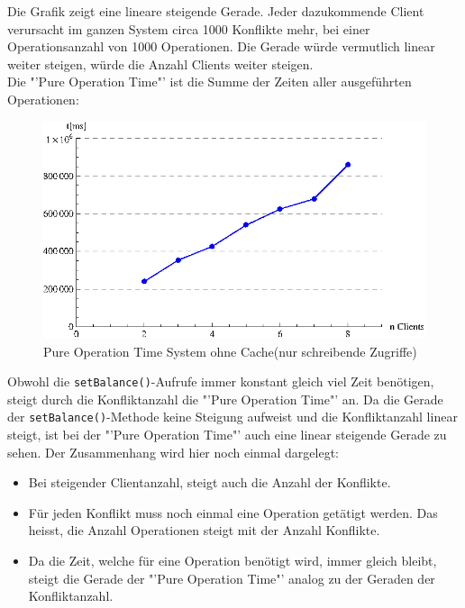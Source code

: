 Die Grafik zeigt eine lineare steigende Gerade. Jeder dazukommende Client verursacht im ganzen System circa 1000 Konflikte mehr, bei einer Operationsanzahl von 1000 Operationen. Die Gerade würde vermutlich linear weiter steigen, würde die Anzahl Clients weiter steigen.\\

Die "'Pure Operation Time"' ist die Summe der Zeiten aller ausgeführten Operationen:

\begin{figure}[H]
\begin{center}
\includegraphics[width=\textwidth]{images_MessErgebnisse/incrementRMIPureOperationTime.eps}
\end{center}
\caption{Pure Operation Time System ohne Cache(nur schreibende Zugriffe)}
\end{figure}

Obwohl die \texttt{setBalance()}-Aufrufe immer konstant gleich viel Zeit be\-nö\-t\-i\-gen, steigt durch die Konfliktanzahl die "'Pure Operation Time"' an. Da die Gerade der \texttt{setBalance()}-Methode keine Steigung aufweist und die Konfliktanzahl linear steigt, ist bei der "'Pure Operation Time"' auch eine linear steigende Gerade zu sehen. Der Zusammenhang wird hier noch einmal dargelegt:
\begin{itemize}
\item Bei steigender Clientanzahl, steigt auch die Anzahl der Konflikte.
\item Für jeden Konflikt muss noch einmal eine Operation getätigt werden. Das heisst, die Anzahl Operationen steigt mit der Anzahl Konflikte.
\item Da die Zeit, welche für eine Operation benötigt wird, immer gleich bleibt, steigt die Gerade der "'Pure Operation Time"' analog zu der Geraden der Konfliktanzahl.
\end{itemize}

